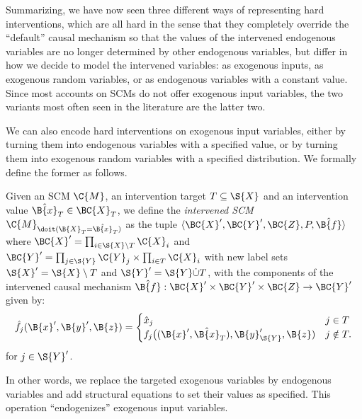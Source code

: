 Summarizing, we have now seen three different ways of representing hard interventions,
which are all hard in the sense that they completely override the ``default''
causal mechanism so that the values of the intervened endogenous variables are
no longer determined by other endogenous variables, but differ in how we decide
to model the intervened variables: as exogenous inputs, as exogenous random
variables, or as endogenous variables with a constant value.
Since most accounts on SCMs do not offer exogenous input variables, the two variants 
most often seen in the literature are the latter two.

We can also encode hard interventions on exogenous input variables, either by turning
them into endogenous variables with a specified value, or by turning them into 
exogenous random variables with a specified distribution. We formally define the
former as follows.
\begin{Def}
  Given an SCM $\C{M}$, an intervention target $T \subseteq \S{X}$ 
  and an intervention value $\hat{\B{x}}_T \in \BC{X}_T$, we define the \emph{intervened SCM
  $\C{M}_{\doit(\B{X}_T=\hat{\B{x}}_T)}$} as the tuple $\langle \BC{X}',\BC{Y}',\BC{Z},P,\hat{\B{f}} \rangle$
  where $\BC{X}' = \prod_{i\in\S{X}\setminus T} \C{X}_i$ and
  $\BC{Y}' = \prod_{j\in\S{Y}} \C{Y}_j \times \prod_{i\in T} \C{X}_i$
  with new label sets $\S{X}' = \S{X}\setminus T$ and $\S{Y}' = \S{Y} \dot\cup T$, 
  with the components of the intervened causal mechanism $\hat{\B{f}} : \BC{X}' \times \BC{Y}' \times \BC{Z} \to \BC{Y}'$ 
  given by:
    $$\hat{f_j}(\B{x}',\B{y}',\B{z}) = \begin{cases}
        \hat{x}_j & j \in T \\
        f_j\big((\B{x}',\hat{\B{x}}_T),\B{y}'_{\S{Y}},\B{z}) & j \notin T.
    \end{cases}$$
  for $j \in \S{Y}'$.
\end{Def}
In other words, we replace the targeted exogenous variables by endogenous variables and add
structural equations to set their values as specified. This operation ``endogenizes'' exogenous input variables.

